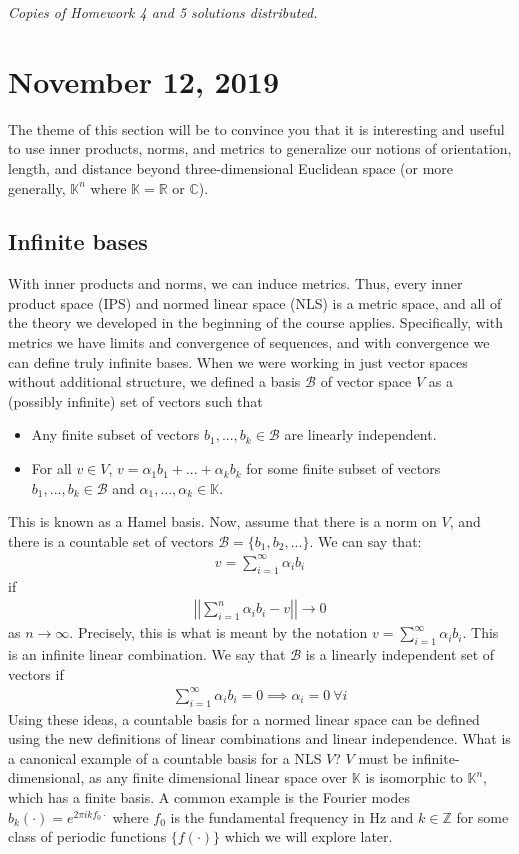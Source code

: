 \documentclass[11pt]{article}
\newcommand{\R}{\ensuremath{\mathbb R}}
\newcommand{\C}{\ensuremath{\mathbb C}}
\newcommand{\K}{\ensuremath{\mathbb K}}
\newcommand{\Z}{\ensuremath{\mathbb Z}}
\newcommand{\B}{\ensuremath{\mathcal B}}
\theoremstyle{plain}
\theoremstyle{definition}
\theoremstyle{remark}
\begin{document}
{\it Copies of Homework 4 and 5 solutions distributed.}

\section{November 12, 2019}

The theme of this section will be to convince you that it is interesting and useful to use inner products, norms, and metrics to generalize our notions of orientation, length, and distance beyond three-dimensional Euclidean space (or more generally, $\K^n$ where $\K = \R$ or $\C$).

\subsection{Infinite bases}

With inner products and norms, we can induce metrics. Thus, every inner product space (IPS) and normed linear space (NLS) is a metric space, and all of the theory we developed in the beginning of the course applies. Specifically, with metrics we have limits and convergence of sequences, and with convergence we can define truly infinite bases. When we were working in just vector spaces without additional structure, we defined a basis $\B$ of vector space $V$ as a (possibly infinite) set of vectors such that
\begin{itemize}
    \item Any finite subset of vectors $b_1, ..., b_k \in \B$ are linearly independent.
    \item For all $v \in V$, $v = \alpha_1b_1 + ... +\alpha_k b_k$ for some finite subset of vectors $b_1, ..., b_k \in \B$ and $\alpha_1, ..., \alpha_k \in \K$.
\end{itemize}
This is known as a Hamel basis. Now, assume that there is a norm on $V$, and there is a countable set of vectors $\B = \{b_1, b_2, ...\}$. We can say that:
\begin{align*}
    v = \sum_{i=1}^\infty \alpha_i b_i 
\end{align*}
if
\begin{align*}
    \left|\left|\sum_{i=1}^n \alpha_i b_i - v\right|\right| \rightarrow 0
\end{align*}
as $n \rightarrow \infty$. Precisely, this is what is meant by the notation $v = \sum_{i=1}^\infty \alpha_i b_i$. This is an infinite linear combination. We say that $\B$ is a linearly independent set of vectors if
\begin{align*}
    \sum_{i=1}^\infty \alpha_i b_i = 0 \implies \alpha_i = 0 \ \forall i
\end{align*}
Using these ideas, a countable basis for a normed linear space can be defined using the new definitions of linear combinations and linear independence. What is a canonical example of a countable basis for a NLS $V$? $V$ must be infinite-dimensional, as any finite dimensional linear space over $\K$ is isomorphic to $\K^n$, which has a finite basis. A common example is the Fourier modes $b_k(\cdot) = e^{2\pi i k f_0 \cdot}$ where $f_0$ is the fundamental frequency in Hz and $k \in \Z$ for some class of periodic functions $\{f(\cdot)\}$ which we will explore later.
\end{document}
